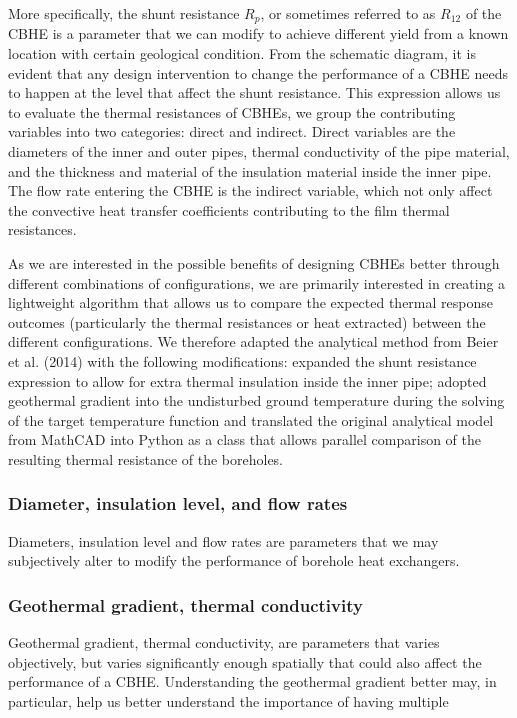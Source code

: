 	More specifically, the shunt resistance $R_p$, or sometimes referred to as $R_{12}$ of the CBHE is a parameter that we can modify to achieve different yield from a known location with certain geological condition. 
	From the schematic diagram, it is evident that any design intervention to change the performance of a CBHE needs to happen at the level that affect the shunt resistance. This expression allows us to evaluate the thermal resistances of CBHEs, we group the contributing variables into two categories: direct and indirect. Direct variables are the diameters of the inner and outer pipes, thermal conductivity of the pipe material, and the thickness and material of the insulation material inside the inner pipe. The flow rate entering the CBHE is the indirect variable, which not only affect the convective heat transfer coefficients contributing to the film thermal resistances. 
	
	As we are interested in the possible benefits of designing CBHEs better through different combinations of configurations, we are primarily interested in creating a lightweight algorithm that allows us to compare the expected thermal response outcomes (particularly the thermal resistances or heat extracted) between the different configurations. We therefore adapted the analytical method from Beier et al. (2014) with the following modifications: expanded the shunt resistance expression to allow for extra thermal insulation inside the inner pipe; adopted geothermal gradient into the undisturbed ground temperature during the solving of the target temperature function and translated the original analytical model from MathCAD into Python as a class that allows parallel comparison of the resulting thermal resistance of the boreholes.


	\subsubsection{Diameter, insulation level, and flow rates}
	Diameters, insulation level and flow rates are parameters that we may subjectively alter to modify the performance of borehole heat exchangers.
	
	\subsubsection{Geothermal gradient, thermal conductivity}
	Geothermal gradient, thermal conductivity, are parameters that varies objectively, but varies significantly enough spatially that could also affect the performance of a CBHE. Understanding the geothermal gradient better may, in particular, help us better understand the importance of having multiple 
	
